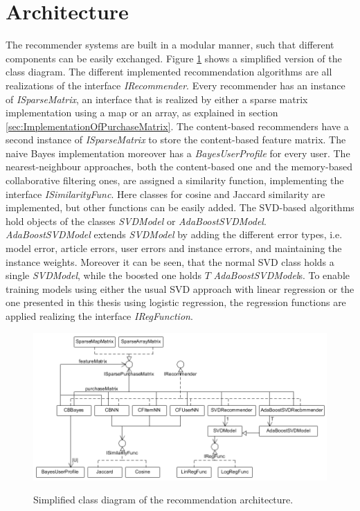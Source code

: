 \documentclass[10pt]{reportMaster}
\begin{document}
\section{Architecture}
\label{sec:Architecture}
The recommender systems are built in a modular manner, such that different components can be easily exchanged.
Figure \ref{fig:classDiagram} shows a simplified version of the class diagram.
The different implemented recommendation algorithms are all realizations of the interface \textit{IRecommender}.
Every recommender has an instance of \textit{ISparseMatrix}, an interface that is realized by either a sparse matrix implementation using a map or an array, as explained in section \ref{sec:ImplementationOfPurchaseMatrix}.
The content-based recommenders have a second instance of \textit{ISparseMatrix} to store the content-based feature matrix.
The naive Bayes implementation moreover has a \textit{BayesUserProfile} for every user.
The nearest-neighbour approaches, both the content-based one and the memory-based collaborative filtering ones, are assigned a similarity function, implementing the interface \textit{ISimilarityFunc}.
Here classes for cosine and Jaccard similarity are implemented, but other functions can be easily added.
The SVD-based algorithms hold objects of the classes \textit{SVDModel} or \textit{AdaBoostSVDModel}.
\textit{AdaBoostSVDModel} extends \textit{SVDModel} by adding the different error types, i.e. model error, article errors, user errors and instance errors, and maintaining the instance weights.
Moreover it can be seen, that the normal SVD class holds a single \textit{SVDModel}, while the boosted one holds $T$ \textit{AdaBoostSVDModel}s.
To enable training models using either the usual SVD approach with linear regression or the one presented in this thesis using logistic regression, the regression functions are applied realizing the interface \textit{IRegFunction}.

\begin{figure}
	\centering
	\includegraphics[width=1\textwidth]{figures/implementation/classDiagram}
	\caption{Simplified class diagram of the recommendation architecture.}
	\textit{}\label{fig:classDiagram}
\end{figure}
\end{document}
